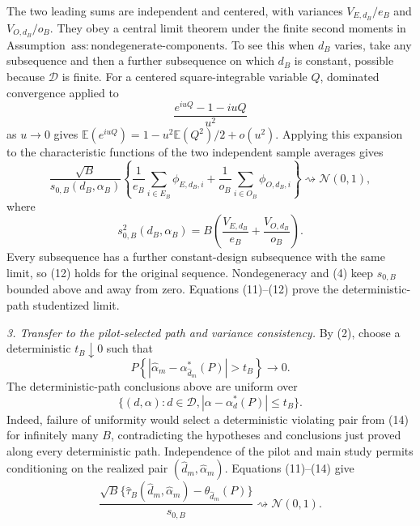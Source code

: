 The two leading sums are independent and centered, with variances \(V_{E,d_B}/e_B\) and \(V_{O,d_B}/o_B\).  They obey a central limit theorem under the finite second moments in Assumption~\(\mathrm{ass{:}nondegenerate\text{-}components}\).  To see this when \(d_B\) varies, take any subsequence and then a further subsequence on which \(d_B\) is constant, possible because \(\mathcal D\) is finite.  For a centered square-integrable variable \(Q\), dominated convergence applied to
\[
 \frac{e^{iuQ}-1-iuQ}{u^2}
\]
as \(u\to0\) gives \(\mathbb E(e^{iuQ})=1-u^2\mathbb E(Q^2)/2+o(u^2)\).  Applying this expansion to the characteristic functions of the two independent sample averages gives
\[
 \frac{\sqrt B}{s_{0,B}(d_B,\alpha_B)}
 \left\{
 \frac1{e_B}\sum_{i\in E_B}\phi_{E,d_B,i}
 +\frac1{o_B}\sum_{i\in O_B}\phi_{O,d_B,i}
 \right\}
 \rightsquigarrow\mathcal N(0,1),                        \tag{12}
\]
where
\[
 s_{0,B}^2(d_B,\alpha_B)
 =B\left(\frac{V_{E,d_B}}{e_B}+\frac{V_{O,d_B}}{o_B}\right).
\]
Every subsequence has a further constant-design subsequence with the same limit, so (12) holds for the original sequence.  Nondegeneracy and (4) keep \(s_{0,B}\) bounded above and away from zero.  Equations (11)--(12) prove the deterministic-path studentized limit.

\emph{3. Transfer to the pilot-selected path and variance consistency.}
By (2), choose a deterministic \(t_B\downarrow0\) such that
\[
 P\left\{
 |\widehat\alpha_m-\alpha_{\widehat d_m}^*(P)|>t_B
 \right\}\longrightarrow0.                              \tag{13}
\]
The deterministic-path conclusions above are uniform over
\[
 \{(d,\alpha):d\in\mathcal D,
 |\alpha-\alpha_d^*(P)|\le t_B\}.                         \tag{14}
\]
Indeed, failure of uniformity would select a deterministic violating pair from (14) for infinitely many \(B\), contradicting the hypotheses and conclusions just proved along every deterministic path.  Independence of the pilot and main study permits conditioning on the realized pair \((\widehat d_m,\widehat\alpha_m)\).  Equations (11)--(14) give
\[
 \frac{\sqrt B\{\widehat\tau_B(\widehat d_m,\widehat\alpha_m)
 -\theta_{\widehat d_m}(P)\}}{s_{0,B}}
 \rightsquigarrow\mathcal N(0,1).                        \tag{15}
\]

